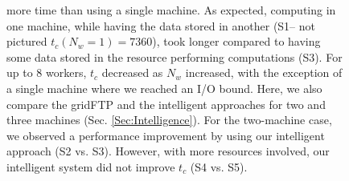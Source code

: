 \documentclass{rspublic}
\newcommand{\fixme}[1]{ { \bf{ ***FIXME: #1
}} } \newcommand{\jhanote}[1]{ {\textcolor{red} { ***Jha: #1 }}}
\newcommand{\micnote}[1]{ {\textcolor{blue} { ***Michael: #1 }}}
\newcommand{\betynote}[1]{ {\textcolor{orange} { ***Bety: #1 }}}
\newcommand{\jhanote}[1]{} \newcommand{\micnote}[1]{}\newcommand{\betynote}[1]{} \newcommand{\fixme}[1]{}
\begin{document}
\begin{figure}[!ht]
\begin{center}
{more time than using a single machine. As expected, computing in one
machine, while having the data stored in another (S1-- not pictured $t_c(N_w=1)=7360$), took longer
compared to having some data stored in the resource performing
computations (S3). For up to 8 workers, $t_c$ decreased as $N_w$
increased, with the exception of a single machine where we reached an
I/O bound. Here, we also compare the gridFTP and the intelligent approaches for two and three machines (Sec. \ref{Sec:Intelligence}). For
the two-machine case, we observed a performance improvement by using our
intelligent approach (S2 vs. S3). However, with more resources involved, our
intelligent system did not improve $t_c$ (S4 vs. S5).}
\label{Fig:ExpIConventionalLocal}
\end{center}
\vspace{-0.3cm}
\end{figure}





\vspace{-0.3cm}

\end{document}
